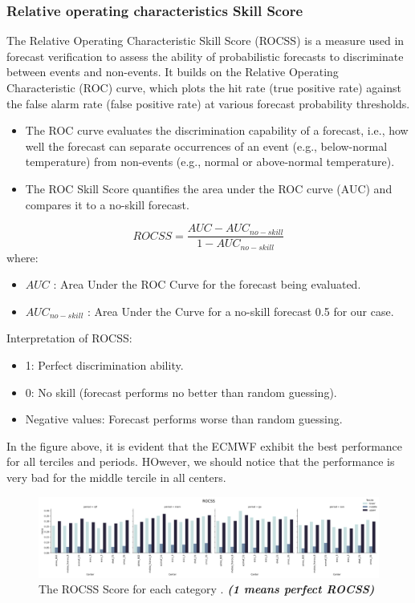 \subsubsection{Relative operating characteristics Skill Score}
The Relative Operating Characteristic Skill Score (ROCSS) is a measure used in forecast verification to assess the ability of probabilistic forecasts to discriminate between events and non-events. It builds on the Relative Operating Characteristic (ROC) curve, which plots the hit rate (true positive rate) against the false alarm rate (false positive rate) at various forecast probability thresholds.

\begin{itemize}
	\item The ROC curve evaluates the discrimination capability of a forecast, i.e., how well the forecast can separate occurrences of an event (e.g., below-normal temperature) from non-events (e.g., normal or above-normal temperature).
	\item The ROC Skill Score quantifies the area under the ROC curve (AUC) and compares it to a no-skill forecast.
\end{itemize}

	$$ROCSS=\frac{AUC-AUC_{no-skill}}{1-AUC_{no-skill}}$$
where:
\begin{itemize}
	\item $AUC$ : Area Under the ROC Curve for the forecast being evaluated.
	\item $AUC_{no-skill}$ : Area Under the Curve for a no-skill forecast 0.5 for our case.
\end{itemize}

Interpretation of ROCSS:
\begin{itemize}
	\item 1: Perfect discrimination ability.
	\item 0: No skill (forecast performs no better than random guessing).
	\item Negative values: Forecast performs worse than random guessing.
\end{itemize}
	

In the figure above, it is evident that the ECMWF exhibit the best performance for all terciles and periods. HOwever, we should notice that the performance is very bad for the middle tercile in all centers.

\begin{figure}[H]
    \centering
    \includegraphics[scale=0.3]{rocss.png}
    \caption{The ROCSS Score for each category  . \textbf{\textit{(1 means perfect ROCSS)}}}
\end{figure}


